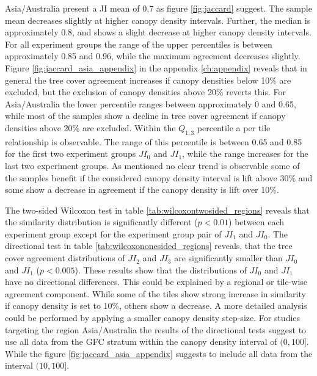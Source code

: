 			Asia/Australia present a \ac{JI} mean of 0.7 as figure \ref{fig:jaccard} suggest. The sample mean decreases slightly at higher canopy density intervals. Further, the median is approximately 0.8, and shows a slight decrease at higher canopy density intervals. For all experiment groups the range of the upper percentiles is between approximately 0.85 and 0.96, while the maximum agreement decreases slightly. Figure \ref{fig:jaccard_asia_appendix} in the appendix \ref{ch:appendix} reveals that in general the tree cover agreement increases if canopy densities below 10\% are excluded, but the exclusion of canopy densities above 20\% reverts this. For Asia/Australia the lower percentile ranges between approximately 0 and 0.65, while most of the samples show a decline in tree cover agreement if canopy densities above 20\% are excluded. Within the $Q_{1,3}$ percentile a per tile relationship is observable. The range of this percentile is between 0.65 and 0.85 for the first two experiment groups $JI_0$ and $JI_1$, while the range increases for the last two experiment groups. As mentioned no clear trend is observable some of the samples benefit if the considered canopy density interval is lift above 30\% and some show a decrease in agreement if the canopy density is lift over 10\%. 

			The two-sided Wilcoxon test in table \ref{tab:wilcoxontwosided_regions} reveals that the similarity distribution is significantly different ($p<0.01$) between each experiment group except for the experiment group pair of $JI_1$ and $JI_0$. The directional test in table \ref{tab:wilcoxononesided_regions} reveals, that the tree cover agreement distributions of $JI_2$ and $JI_3$ are significantly smaller than $JI_0$ and $JI_1$ ($p<0.005$). These results show that the distributions of $JI_0$ and $JI_1$ have no directional differences. This could be explained by a regional or tile-wise agreement component. While some of the tiles show strong increase in similarity if canopy density is set to 10\%, others show a decrease. A more detailed analysis could be performed by applying a smaller canopy density step-size. For studies targeting the region Asia/Australia the results of the directional tests suggest to use all data from the \ac{GFC} stratum within the canopy density interval of $(0,100]$. While the figure \ref{fig:jaccard_asia_appendix} suggests to include all data from the interval $(10,100]$.

